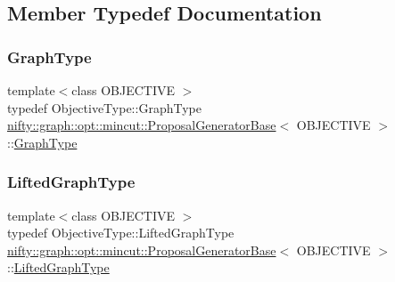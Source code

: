 \subsection{Member Typedef Documentation}
\mbox{\label{classnifty_1_1graph_1_1opt_1_1mincut_1_1ProposalGeneratorBase_af97d0dbcc40754191cc6fa0c2baa6018}} 
\subsubsection{\texorpdfstring{Graph\+Type}{GraphType}}
{\footnotesize\ttfamily template$<$class O\+B\+J\+E\+C\+T\+I\+VE $>$ \\
typedef Objective\+Type\+::\+Graph\+Type \hyperlink{classnifty_1_1graph_1_1opt_1_1mincut_1_1ProposalGeneratorBase}{nifty\+::graph\+::opt\+::mincut\+::\+Proposal\+Generator\+Base}$<$ O\+B\+J\+E\+C\+T\+I\+VE $>$\+::\hyperlink{classnifty_1_1graph_1_1opt_1_1mincut_1_1ProposalGeneratorBase_af97d0dbcc40754191cc6fa0c2baa6018}{Graph\+Type}}

\mbox{\label{classnifty_1_1graph_1_1opt_1_1mincut_1_1ProposalGeneratorBase_ab034c7564972906e2f6e7ca9c0a68437}} 
\subsubsection{\texorpdfstring{Lifted\+Graph\+Type}{LiftedGraphType}}
{\footnotesize\ttfamily template$<$class O\+B\+J\+E\+C\+T\+I\+VE $>$ \\
typedef Objective\+Type\+::\+Lifted\+Graph\+Type \hyperlink{classnifty_1_1graph_1_1opt_1_1mincut_1_1ProposalGeneratorBase}{nifty\+::graph\+::opt\+::mincut\+::\+Proposal\+Generator\+Base}$<$ O\+B\+J\+E\+C\+T\+I\+VE $>$\+::\hyperlink{classnifty_1_1graph_1_1opt_1_1mincut_1_1ProposalGeneratorBase_ab034c7564972906e2f6e7ca9c0a68437}{Lifted\+Graph\+Type}}

